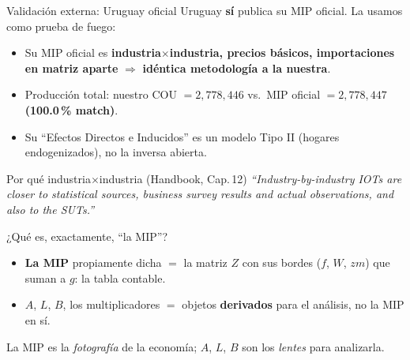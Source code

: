 \documentclass[aspectratio=169,10pt]{beamer}
\newcommand{\hb}[1]{\textit{\color{gris}\small ``#1''}}
\begin{document}
\begin{frame}{Validación externa: Uruguay oficial}
  Uruguay \textbf{sí} publica su MIP oficial. La usamos como prueba de fuego:
  \begin{itemize}
    \item Su MIP oficial es \textbf{industria$\times$industria, precios básicos, importaciones en matriz aparte} $\Rightarrow$ \textbf{idéntica metodología a la nuestra}.
    \item Producción total: nuestro COU $=2{,}778{,}446$ vs.\ MIP oficial $=2{,}778{,}447$ \; \textbf{(100.0\,\% match)}.
    \item Su ``Efectos Directos e Inducidos'' es un modelo Tipo II (hogares endogenizados), no la inversa abierta.
  \end{itemize}
  \begin{block}{Por qué industria$\times$industria (Handbook, Cap.\,12)}
  \hb{Industry-by-industry IOTs are closer to statistical sources, business survey results and actual observations, and also to the SUTs.}
  \end{block}
\end{frame}

\begin{frame}{¿Qué es, exactamente, ``la MIP''?}
  \begin{center}
  \end{center}
  \begin{itemize}
    \item \textbf{La MIP} propiamente dicha $=$ la matriz $Z$ con sus bordes ($f$, $W$, $zm$) que suman a $g$: la tabla contable.
    \item $A$, $L$, $B$, los multiplicadores $=$ objetos \textbf{derivados} para el análisis, no la MIP en sí.
  \end{itemize}
  \begin{center}\small\color{gris}
  La MIP es la \emph{fotografía} de la economía; $A$, $L$, $B$ son los \emph{lentes} para analizarla.
  \end{center}
\end{frame}
\end{document}
